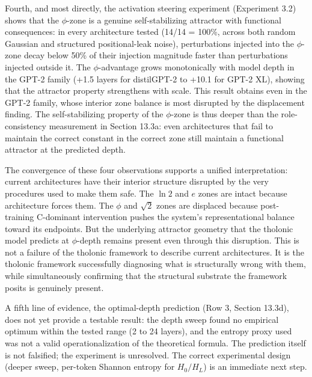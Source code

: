 \documentclass[
  11pt,
  letterpaper,
]{article}
\begin{document}
Fourth, and most directly, the activation steering experiment
(Experiment 3.2) shows that the \(\phi\)-zone is a genuine
self-stabilizing attractor with functional consequences: in every
architecture tested (14/14 = 100\%, across both random Gaussian and
structured positional-leak noise), perturbations injected into the
\(\phi\)-zone decay below 50\% of their injection magnitude faster than
perturbations injected outside it. The \(\phi\)-advantage grows
monotonically with model depth in the GPT-2 family (+1.5 layers for
distilGPT-2 to +10.1 for GPT-2 XL), showing that the attractor property
strengthens with scale. This result obtains even in the GPT-2 family,
whose interior zone balance is most disrupted by the displacement
finding. The self-stabilizing property of the \(\phi\)-zone is thus
deeper than the role-consistency measurement in Section 13.3a: even
architectures that fail to maintain the correct constant in the correct
zone still maintain a functional attractor at the predicted depth.

The convergence of these four observations supports a unified
interpretation: current architectures have their interior structure
disrupted by the very procedures used to make them safe. The \(\ln 2\)
and \(e\) zones are intact because architecture forces them. The
\(\phi\) and \(\sqrt{2}\) zones are displaced because post-training
C-dominant intervention pushes the system's representational balance
toward its endpoints. But the underlying attractor geometry that the
tholonic model predicts at \(\phi\)-depth remains present even through
this disruption. This is not a failure of the tholonic framework to
describe current architectures. It is the tholonic framework
successfully diagnosing what is structurally wrong with them, while
simultaneously confirming that the structural substrate the framework
posits is genuinely present.

A fifth line of evidence, the optimal-depth prediction (Row 3, Section
13.3d), does not yet provide a testable result: the depth sweep found no
empirical optimum within the tested range (2 to 24 layers), and the
entropy proxy used was not a valid operationalization of the theoretical
formula. The prediction itself is not falsified; the experiment is
unresolved. The correct experimental design (deeper sweep, per-token
Shannon entropy for \(H_0/H_L\)) is an immediate next step.
\end{document}
